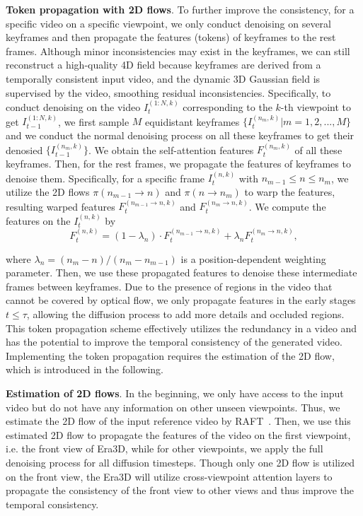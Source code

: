 \textbf{Token propagation with 2D flows}.
To further improve the consistency, for a specific video on a specific viewpoint, we only conduct denoising on several keyframes and then propagate the features (tokens) of keyframes to the rest frames.
Although minor inconsistencies may exist in the keyframes, we can still reconstruct a high-quality 4D field because keyframes are derived from a temporally consistent input video, and the dynamic 3D Gaussian field is supervised by the video, smoothing residual inconsistencies.
Specifically, to conduct denoising on the video $I^{(1:N,k)}_t$ corresponding to the $k$-th viewpoint to get $I^{(1:N,k)}_{t-1}$, we first sample $M$ equidistant keyframes $\{I^{(n_m,k)}_t|m=1,2,...,M\}$ and we conduct the normal denoising process on all these keyframes to get their denosied $\{I^{(n_m,k)}_{t-1}\}$. We obtain the self-attention features $F^{(n_m,k)}_t$ of all these keyframes. Then, for the rest frames, we propagate the features of keyframes to denoise them. Specifically, for a specific frame $I_t^{(n,k)}$ with $n_{m-1}\le n \le n_{m}$, we utilize the 2D flows $\pi({n_{m-1}\to n})$ and $\pi(n \to n_{m})$ to warp the features, resulting warped features $F^{(n_{m-1}\to n,k)}_t$ and $F^{(n_{m}\to n , k)}_t$. We compute the features on the  $I_t^{(n,k)}$ by
\begin{equation}
    F^{(n,k)}_t =(1-\lambda_{n}) \cdot F^{(n_{m-1}\to n,k)}_t + \lambda_{n} F^{(n_{m}\to n,k)}_t,
    \label{eq:propagate}
\end{equation}

where $\lambda_n = (n_{m}-n)/(n_{m}-n_{m-1})$ is a position-dependent weighting parameter. Then, we use these propagated features to denoise these intermediate frames between keyframes. Due to the presence of regions in the video that cannot be covered by optical flow, we only propagate features in the early stages $t\le \tau$, allowing the diffusion process to add more details and occluded regions. This token propagation scheme effectively utilizes the redundancy in a video and has the potential to improve the temporal consistency of the generated video. Implementing the token propagation requires the estimation of the 2D flow, which is introduced in the following. 


\textbf{Estimation of 2D flows}. In the beginning, we only have access to the input video but do not have any information on other unseen viewpoints. Thus, we estimate the 2D flow of the input reference video by RAFT~\citep{teed2020raft}. Then, we use this estimated 2D flow to propagate the features of the video on the first viewpoint, i.e. the front view of Era3D, while for other viewpoints, we apply the full denoising process for all diffusion timesteps. Though only one 2D flow is utilized on the front view, the Era3D will utilize cross-viewpoint attention layers to propagate the consistency of the front view to other views and thus improve the temporal consistency. 


